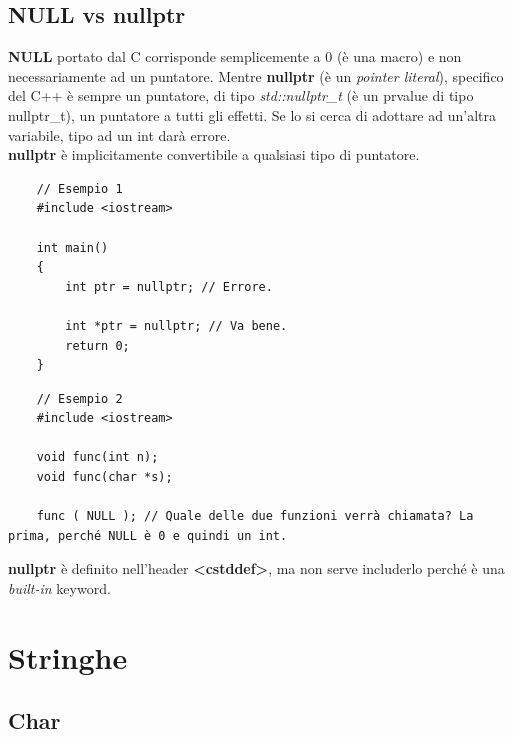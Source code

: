 \subsection{NULL vs nullptr}

\textsf{\small \textbf{NULL} portato dal C corrisponde semplicemente a 0 (è una macro) e non necessariamente ad un puntatore. Mentre \textbf{nullptr} (è un \emph{pointer literal}), specifico del C++ è sempre un puntatore, di tipo \emph{std::nullptr\_t} (è un prvalue di tipo nullptr\_t), un puntatore a tutti gli effetti. Se lo si cerca di adottare ad un'altra variabile, tipo ad un int darà errore.} \\

\textsf{\small \textbf{nullptr} è implicitamente convertibile a qualsiasi tipo di puntatore.} \\

\begin{lstlisting}
	// Esempio 1
	#include <iostream>
	
	int main()
	{
		int ptr = nullptr; // Errore.
		
		int *ptr = nullptr; // Va bene.
		return 0;
	}
\end{lstlisting}

\begin{lstlisting}
	// Esempio 2
	#include <iostream>
	
	void func(int n);
	void func(char *s);
	
	func ( NULL ); // Quale delle due funzioni verrà chiamata? La prima, perché NULL è 0 e quindi un int.
\end{lstlisting}

\textsf{\small \textbf{nullptr} è definito nell'header \textbf{<cstddef>}, ma non serve includerlo perché è una \emph{built-in} keyword.} \\ 


\newpage

\section{Stringhe}


\subsection{Char}

